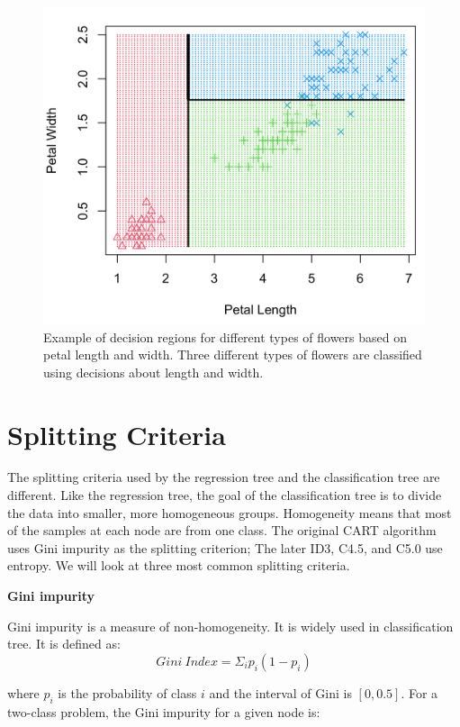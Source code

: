 \documentclass[
  12pt,
]{krantz}
\begin{document}
\begin{figure}

{\centering \includegraphics[width=0.8\linewidth]{images/decisionregion} 

}

\caption{Example of decision regions for different types of flowers based on petal length and width. Three different types of flowers are classified using decisions about length and width.}\label{fig:decisionregion}
\end{figure}

\hypertarget{splitting-criteria}{%
\section{Splitting Criteria}\label{splitting-criteria}}

The splitting criteria used by the regression tree and the classification tree are different. Like the regression tree, the goal of the classification tree is to divide the data into smaller, more homogeneous groups. Homogeneity means that most of the samples at each node are from one class. The original CART algorithm uses Gini impurity as the splitting criterion; The later ID3, C4.5, and C5.0 use entropy. We will look at three most common splitting criteria.

\textbf{Gini impurity}

Gini impurity \citep{Breiman1984} is a measure of non-homogeneity. It is widely used in classification tree. It is defined as:
\[Gini\ Index = \Sigma_i p_i(1-p_i)\]

where \(p_i\) is the probability of class \(i\) and the interval of Gini is \([0, 0.5]\). For a two-class problem, the Gini impurity for a given node is:
\end{document}
